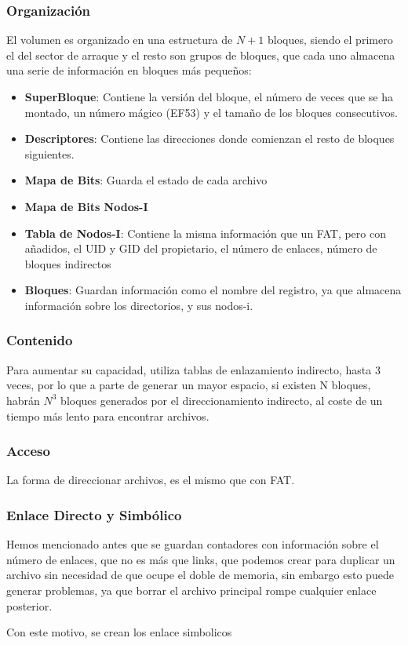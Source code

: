 \subsubsection{Organización}
\noindent El volumen es organizado en una estructura de \(N + 1\) bloques, siendo el primero el del sector de arraque y el resto son grupos de bloques, que cada uno almacena una serie de información en bloques más pequeños:
\begin{itemize}
        \item \textbf{SuperBloque}: Contiene la versión del bloque, el número de veces que se ha montado, un número mágico (EF53) y el tamaño de los bloques consecutivos.
        \item \textbf{Descriptores}: Contiene las direcciones donde comienzan el resto de bloques siguientes.
        \item \textbf{Mapa de Bits}: Guarda el estado de cada archivo
        \item \textbf{Mapa de Bits Nodos-I}
        \item \textbf{Tabla de Nodos-I}: Contiene la misma información que un FAT, pero con añadidos, el UID y GID del propietario, el número de enlaces, número de bloques indirectos
        \item \textbf{Bloques}: Guardan información como el nombre del registro, ya que almacena información sobre los directorios, y sus nodos-i.
\end{itemize}
\subsubsection{Contenido}
\noindent Para aumentar su capacidad, utiliza tablas de enlazamiento indirecto, hasta 3 veces, por lo que a parte de generar un mayor espacio, si existen N bloques, habrán \(N^3\) bloques generados por el direccionamiento indirecto, al coste de un tiempo más lento para encontrar archivos.

\subsubsection{Acceso}
\noindent La forma de direccionar archivos, es el mismo que con FAT.
\subsubsection{Enlace Directo y Simbólico}
\noindent Hemos mencionado antes que se guardan contadores con información sobre el número de enlaces, que no es más que links, que podemos crear para duplicar un archivo sin necesidad de que ocupe el doble de memoria, sin embargo esto puede generar problemas, ya que borrar el archivo principal rompe cualquier enlace posterior.
\par \noindent Con este motivo, se crean los enlace simbolicos
